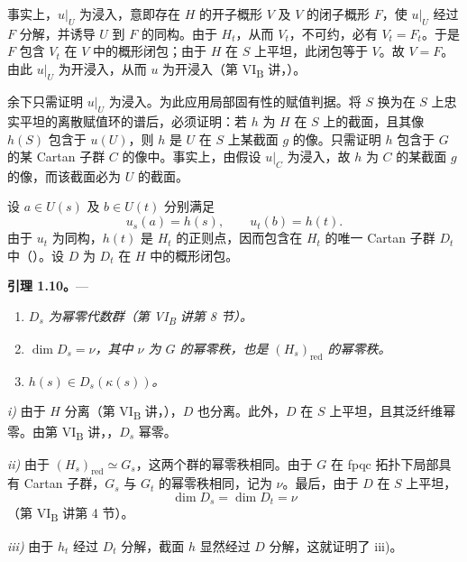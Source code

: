 事实上，\(u|_U\) 为浸入，意即存在 \(H\) 的开子概形 \(V\) 及 \(V\) 的闭子概形 \(F\)，使 \(u|_U\) 经过 \(F\) 分解，并诱导 \(U\) 到 \(F\) 的同构。由于 \(H_t\)，从而 \(V_t\)，不可约，必有 \(V_t=F_t\)。于是 \(F\) 包含 \(V_t\) 在 \(V\) 中的概形闭包；由于 \(H\) 在 \(S\) 上平坦，此闭包等于 \(V\)。故 \(V=F\)。由此 \(u|_U\) 为开浸入，从而 \(u\) 为开浸入（第 VI\textsubscript{B} 讲，）。

余下只需证明 \(u|_U\) 为浸入。为此应用局部固有性的赋值判据。将 \(S\) 换为在 \(S\) 上忠实平坦的离散赋值环的谱后，必须证明：若 \(h\) 为 \(H\) 在 \(S\) 上的截面，且其像 \(h(S)\) 包含于 \(u(U)\)，则 \(h\) 是 \(U\) 在 \(S\) 上某截面 \(g\) 的像。只需证明 \(h\) 包含于 \(G\) 的某 Cartan 子群 \(C\) 的像中。事实上，由假设 \(u|_C\) 为浸入，故 \(h\) 为 \(C\) 的某截面 \(g\) 的像，而该截面必为 \(U\) 的截面。

设 \(a\in U(s)\) 及 \(b\in U(t)\) 分别满足
\[
  u_s(a)=h(s),
  \qquad
  u_t(b)=h(t).
\]
由于 \(u_t\) 为同构，\(h(t)\) 是 \(H_t\) 的正则点，因而包含在 \(H_t\) 的唯一 Cartan 子群 \(D_t\) 中（）。设 \(D\) 为 \(D_t\) 在 \(H\) 中的概形闭包。

\medskip
\noindent{}%
\textbf{引理 1.10。}---
\begin{enumerate}
\item[\textit{i)}] \textit{\(D_s\) 为幂零代数群（第 VI\textsubscript{B} 讲第 8 节）。}
\item[\textit{ii)}] \textit{\(\dim D_s=\nu\)，其中 \(\nu\) 为 \(G\) 的幂零秩，也是 \((H_s)_{\mathrm{red}}\) 的幂零秩。}
\item[\textit{iii)}] \textit{\(h(s)\in D_s(\kappa(s))\)。}
\end{enumerate}

\noindent\textit{i)}
由于 \(H\) 分离（第 VI\textsubscript{B} 讲，），\(D\) 也分离。此外，\(D\) 在 \(S\) 上平坦，且其泛纤维幂零。由第 VI\textsubscript{B} 讲，，\(D_s\) 幂零。

\smallskip
\noindent\textit{ii)}
由于 \((H_s)_{\mathrm{red}}\simeq G_s\)，这两个群的幂零秩相同。由于 \(G\) 在 fpqc 拓扑下局部具有 Cartan 子群，\(G_s\) 与 \(G_t\) 的幂零秩相同，记为 \(\nu\)。最后，由于 \(D\) 在 \(S\) 上平坦，
\[
  \dim D_s=\dim D_t=\nu
\]
（第 VI\textsubscript{B} 讲第 4 节）。

\smallskip
\noindent\textit{iii)}
由于 \(h_t\) 经过 \(D_t\) 分解，截面 \(h\) 显然经过 \(D\) 分解，这就证明了 iii)。


